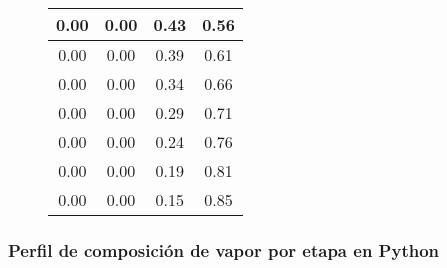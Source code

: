 \begin{figure}[H]
\begin{tabular}{|c|c|c|c|}
        0.00           & 0.00             & 0.43              & 0.56               \\
        \hline
        0.00           & 0.00             & 0.39              & 0.61               \\
        \hline
        0.00           & 0.00             & 0.34              & 0.66               \\
        \hline
        0.00           & 0.00             & 0.29              & 0.71               \\
        \hline
        0.00           & 0.00             & 0.24              & 0.76               \\
        \hline
        0.00           & 0.00             & 0.19              & 0.81               \\
        \hline
        0.00           & 0.00             & 0.15              & 0.85               \\
        \hline
    \end{tabular}
    \normalsize
\end{figure}

\newpage

\subsubsection{Perfil de composición de vapor por etapa en Python}

